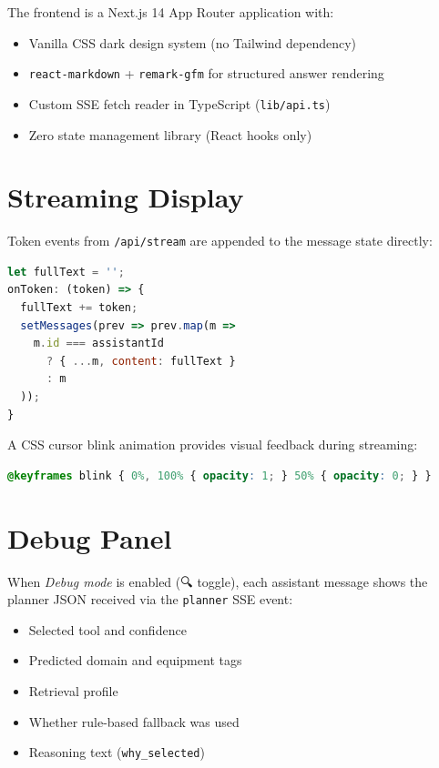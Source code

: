 \documentclass[12pt,a4paper]{report}
\begin{document}
The frontend is a Next.js 14 App Router application with:
\begin{itemize}
  \item Vanilla CSS dark design system (no Tailwind dependency)
  \item \texttt{react-markdown} + \texttt{remark-gfm} for structured answer rendering
  \item Custom SSE fetch reader in TypeScript (\texttt{lib/api.ts})
  \item Zero state management library (React hooks only)
\end{itemize}

\section{Streaming Display}

Token events from \texttt{/api/stream} are appended to the message state directly:

\begin{lstlisting}[language=JavaScript, caption={SSE token accumulation}]
let fullText = '';
onToken: (token) => {
  fullText += token;
  setMessages(prev => prev.map(m =>
    m.id === assistantId
      ? { ...m, content: fullText }
      : m
  ));
}
\end{lstlisting}

A CSS cursor blink animation provides visual feedback during streaming:

\begin{lstlisting}[language=CSS, caption={Cursor blink keyframe}]
@keyframes blink { 0%, 100% { opacity: 1; } 50% { opacity: 0; } }
\end{lstlisting}

\section{Debug Panel}

When \textit{Debug mode} is enabled (🔍 toggle), each assistant message shows the planner JSON received via the \texttt{planner} SSE event:

\begin{itemize}
  \item Selected tool and confidence
  \item Predicted domain and equipment tags
  \item Retrieval profile
  \item Whether rule-based fallback was used
  \item Reasoning text (\texttt{why\_selected})
\end{itemize}
\end{document}
